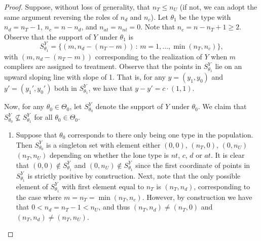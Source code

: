 \documentclass[12pt,reqno]{amsart}
\begin{document}
\begin{proof}
Suppose, without loss of generality, that $n_T \leq n_U$ (if not, we can adopt the same argument reversing the roles of $n_d$ and $n_c$). Let $\theta_1$ be the type with $n_d = n_T - 1$, $n_c = n-n_d $, and $n_{at}=n_{nt} = 0$. Note that $n_c = n-n_T +1 \geq 2$. Observe that the support of $Y$ under $\theta_1$ is $$S_{\theta_1}^Y = \{ (m,n_d-(n_T-m)) \,:\, m=1,..., \min(n_T, n_c) \},$$ with $(m,n_d-(n_T-m))$ corresponding to the realization of $Y$ when $m$ compliers are assigned to treatment. Observe that the points in $S_{\theta_1}^Y$ lie on an upward sloping line with slope of 1. That is, for any $y= (y_1,y_0)$ and $y' =(y_1',y_0')$ both in $S^Y_{\theta_1}$, we have that $y-y' = c \cdot (1,1)$. 

Now, for any $\theta_0 \in \Theta_0$, let $S^Y_{\theta_0}$ denote the support of $Y$ under $\theta_0$. We claim that $S^Y_{\theta_0} \not\subseteq S^Y_{\theta_1}$ for all
$\theta_0 \in \Theta_0$. 

\begin{enumerate}
    \item [Case 1] Suppose that $\theta_0$ corresponds to there only being
one type in the population. Then $S_{\theta_0}^Y$ is a singleton set with element either $
(0,0)$, $(n_T,0)$, $(0,n_U)$ $(n_T,n_U)$ depending on whether the lone type is $nt$, $c$, $d$ or $at$. It is
clear that $(0,0) \not\in S_{\theta_1}^Y$ and $(0,n_U) \not\in S_{\theta_1}^Y$ since the first coordinate of points in $S_{\theta_1}^Y$ is strictly positive by construction. Next, note that the only possible element of
$S_{\theta_1}^Y$ with first element equal to $n_T$ is $(n_T,n_d)$, corresponding to the
case where $m = n_T = \min(n_T,n_c)$. However, by construction we have that $0 < n_d =
n_T - 1 < n_U$, and thus $(n_T,n_d) \neq (n_T,0)$ and $(n_T,n_d) \neq (n_T,n_U)$.






\end{enumerate}
\end{proof}
\end{document}
